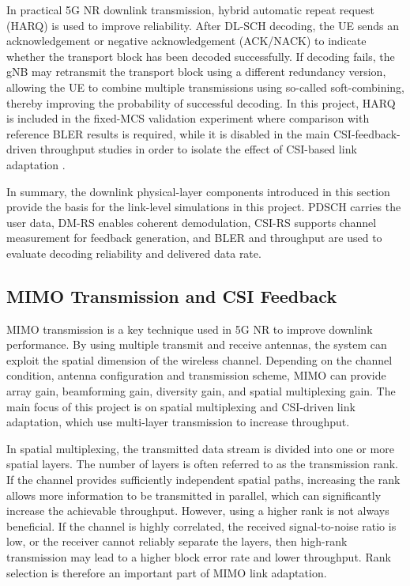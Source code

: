 \documentclass[a4paper,12pt,onecolumn]{article}
\begin{document}
	In practical 5G NR downlink transmission, hybrid automatic repeat request (HARQ) is used to improve reliability. After DL-SCH decoding, the UE sends an acknowledgement or negative acknowledgement (ACK/NACK) to indicate whether the transport block has been decoded successfully. If decoding fails, the gNB may retransmit the transport block using a different redundancy version, allowing the UE to combine multiple transmissions using so-called soft-combining, thereby improving the probability of successful decoding. In this project, HARQ is included in the fixed-MCS validation experiment where comparison with reference BLER results is required, while it is disabled in the main CSI-feedback-driven throughput studies in order to isolate the effect of CSI-based link adaptation \cite[Ch.~9]{EricssonBook} \cite{MathWorks2026}.

	In summary, the downlink physical-layer components introduced in this section provide the basis for the link-level simulations in this project. PDSCH carries the user data, DM-RS enables coherent demodulation, CSI-RS supports channel measurement for feedback generation, and BLER and throughput are used to evaluate decoding reliability and delivered data rate. 


	
\subsection{MIMO Transmission and CSI Feedback}
		MIMO transmission is a key technique used in 5G NR to improve downlink performance. By using multiple transmit and receive antennas, the system can exploit the spatial dimension of the wireless channel. Depending on the
		channel condition, antenna configuration and transmission scheme, MIMO can provide array gain, beamforming gain, diversity gain, and spatial multiplexing gain.  The main focus of this project is on spatial multiplexing and CSI-driven link adaptation, which use multi-layer transmission to increase throughput.
		
		In spatial multiplexing, the transmitted data stream is divided into one or more spatial layers. The number of layers is often referred to as the transmission rank. If the channel provides sufficiently independent spatial paths, increasing the rank allows more information to be transmitted in parallel, which can significantly increase the achievable throughput. However, using a higher rank is not always beneficial. If the channel is highly correlated, the received signal-to-noise ratio is low, or the receiver cannot reliably separate the layers, then high-rank transmission may lead to a higher block error rate and lower throughput. Rank selection is therefore an important part of MIMO link adaptation.
		
\end{document}

